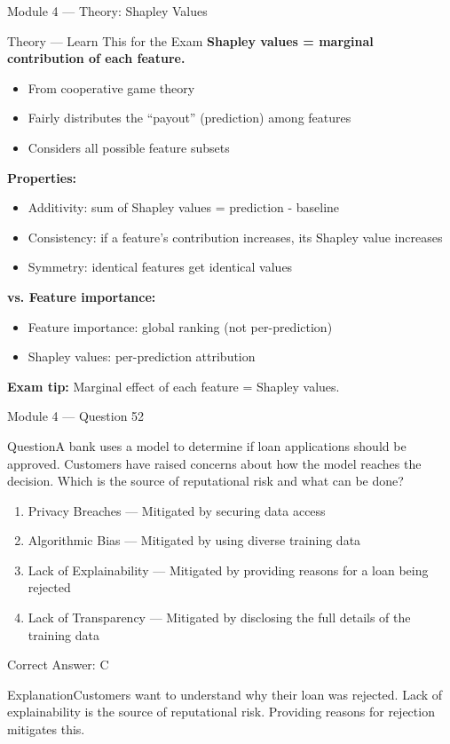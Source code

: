 \documentclass[aspectratio=169,10pt]{beamer}
\newcommand{\question}[1]{\begin{block}{Question}#1\end{block}}
\newcommand{\options}[4]{%
	\begin{enumerate}[label=\Alph*.,leftmargin=*]
		\item #1
		\item #2
		\item #3
		\item #4
	\end{enumerate}
}
\newcommand{\answerbox}[1]{\begin{exampleblock}{Correct Answer: #1}\end{exampleblock}}
\newcommand{\explain}[1]{\begin{block}{Explanation}#1\end{block}}
\newcommand{\theory}[1]{%
	\begin{block}{Theory --- Learn This for the Exam}
		\small #1
	\end{block}
}
\begin{document}
	\begin{frame}{Module 4 --- Theory: Shapley Values}
		\theory{
			\textbf{Shapley values = marginal contribution of each feature.}
			\begin{itemize}
				\item From cooperative game theory
				\item Fairly distributes the ``payout'' (prediction) among features
				\item Considers all possible feature subsets
			\end{itemize}
			\textbf{Properties:}
			\begin{itemize}
				\item Additivity: sum of Shapley values = prediction - baseline
				\item Consistency: if a feature's contribution increases, its Shapley value increases
				\item Symmetry: identical features get identical values
			\end{itemize}
			\textbf{vs. Feature importance:}
			\begin{itemize}
				\item Feature importance: global ranking (not per-prediction)
				\item Shapley values: per-prediction attribution
			\end{itemize}
			\textbf{Exam tip:} Marginal effect of each feature = Shapley values.
		}
	\end{frame}
	
	\begin{frame}{Module 4 --- Question 52}
		\question{A bank uses a model to determine if loan applications should be approved. Customers have raised concerns about how the model reaches the decision. Which is the source of reputational risk and what can be done?}
		\options{Privacy Breaches --- Mitigated by securing data access}{Algorithmic Bias --- Mitigated by using diverse training data}{Lack of Explainability --- Mitigated by providing reasons for a loan being rejected}{Lack of Transparency --- Mitigated by disclosing the full details of the training data}
		\answerbox{C}
		\explain{Customers want to understand why their loan was rejected. Lack of explainability is the source of reputational risk. Providing reasons for rejection mitigates this.}
	\end{frame}
	
\end{document}
